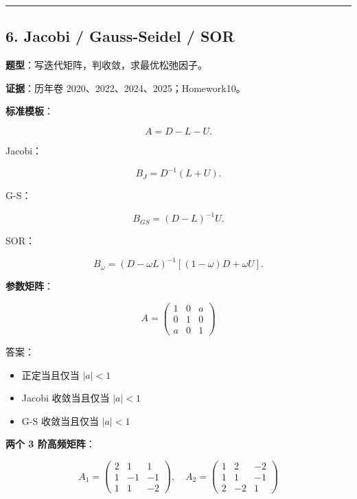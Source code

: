 \documentclass[11pt,a4paper]{ctexart}
\begin{document}
\bigskip\hrule\bigskip


\subsection*{6. Jacobi / Gauss-Seidel / SOR}


\textbf{题型}：写迭代矩阵，判收敛，求最优松弛因子。

\textbf{证据}：历年卷 2020、2022、2024、2025；Homework10。

\textbf{标准模板}：

\[
A=D-L-U.
\]

Jacobi：

\[
B_J=D^{-1}(L+U).
\]

G-S：

\[
B_{GS}=(D-L)^{-1}U.
\]

SOR：

\[
B_\omega=(D-\omega L)^{-1}[(1-\omega)D+\omega U].
\]

\textbf{参数矩阵}：

\[
A=\begin{pmatrix}1&0&a\\0&1&0\\a&0&1\end{pmatrix}
\]

答案：

\begin{itemize}

\item 正定当且仅当 $|a|<1$

\item Jacobi 收敛当且仅当 $|a|<1$

\item G-S 收敛当且仅当 $|a|<1$

\end{itemize}

\textbf{两个 3 阶高频矩阵}：

\[
A_1=\begin{pmatrix}2&1&1\\1&-1&-1\\1&1&-2\end{pmatrix},\quad
A_2=\begin{pmatrix}1&2&-2\\1&1&-1\\2&-2&1\end{pmatrix}
\]
\end{document}

